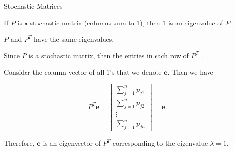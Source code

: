 \documentclass[xcolor=dvipsnames,aspectratio=169,t]{beamer}
\begin{document}
\begin{frame}{Stochastic Matrices}

  \begin{theorem}
  If $P$ is a \alert{stochastic matrix} (columns sum to $1$), then $1$ is an eigenvalue of $P$.
  \end{theorem}

  \pause

  $P$ and $P^T$ have the \alert{same eigenvalues}.
  \smallskip

  \pause
  Since $P$ is a stochastic matrix, then the entries in each row of $P^T$ .
  \smallskip

  \pause
  Consider the column vector of all $1$'s that we denote $\mathbf{e}$. Then we have

  \[ P^T \mathbf{e} =  \begin{bmatrix} \sum_{j=1}^n p_{j1} \\   \sum_{j=1}^n p_{j2} \\ \vdots \\   \sum_{j=1}^n p_{jn} \end{bmatrix} =  \mathbf{e}. \]

  Therefore, $\mathbf{e}$ is an eigenvector of $P^T$ corresponding to the eigenvalue $\lambda = 1$.
  \hfill\blue{$\square$}
\end{frame}
\end{document}
